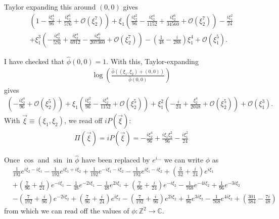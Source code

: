 \documentclass{article}
\theoremstyle{definition}
\newcommand{\nn}{\nonumber}
\newcommand{\f}[2]{\frac{#1}{#2}}
\newcommand{\lp}{\left(}
\newcommand{\rp}{\right)}
\begin{document}
Taylor expanding this around $(0,0)$ gives 
\begin{align}
\left(1-\frac{i\xi_2^4}{96}+\frac{i\xi_2^6}{576}+ \mathcal{O}\left( \xi_2^7\right)\right) + \xi_1 \left(\frac{i  \xi_2^2}{96}-\frac{i  \xi_2^4}{1152}+\frac{i  \xi_2^6}{34560}+ \mathcal{O}\left( \xi_2^7 \right)\right)-\frac{i\xi_1^2}{24}\nn\\
+ \xi_1^3 \left(-\frac{i\xi_2^2}{576}+\frac{i\xi_2^4}{6912}-\frac{i\xi_2^6}{207360}+ \mathcal{O}\left( \xi_2^7\right)\right)-\left(\frac{1}{48}-\frac{i}{288}\right)  \xi_1^4+ \mathcal{O}\left( \xi_1^5\right).
\end{align}

I have checked that $\hat{\phi}(0,0) = 1$. With this, Taylor-expanding
\begin{align}
\log\lp \f{\hat\phi((\xi_1,\xi_2) + (0,0))}{\hat\phi(0,0)} \rp
\end{align} 
gives
\begin{align}
\left(-\frac{i  \xi_2^4}{96}+\mathcal{O}\left( \xi_2^5\right)\right)+ \xi_1 \left(\frac{i  \xi_2^2}{96}-\frac{i  \xi_2^4}{1152}+\mathcal{O}\left( \xi_2^5\right)\right)+ \xi_1^2 \left(-\frac{i}{24}+\frac{ \xi_2^4}{2048}+\mathcal{O}\left( \xi_2^5\right)\right)+\mathcal{O}\left( \xi_1^3\right).
\end{align}
With $\vec\xi \equiv (\xi_1,\xi_2)$, we read off $iP(\vec\xi)$:
\begin{align}
\boxed{\Pi(\vec{\xi}) = iP(\vec{\xi}) = -\frac{i  \xi_2^4}{96} + \frac{i \xi_1  \xi_2^2}{96} -\f{i\xi_1^2}{24} }
\end{align}

Once $\cos$ and $\sin$ in $\hat{\phi}$ have been replaced by $e^{i\dots}$ we can write $\hat\phi$ as
\begin{align}
&\frac{1}{192} e^{i \xi_2-i \xi_1} -\frac{1}{192} e^{i \xi_1+i \xi_2} +\frac{1}{192} e^{-i \xi_1-i \xi_2} -\frac{1}{192} e^{i \xi_1-i\xi_2}+\left(\frac{3}{32}+\frac{i}{24}\right) e^{i \xi_1}\nn\\
&+\left(\frac{7}{96}+\frac{i}{24}\right) e^{-i \xi_1}-\frac{1}{48} e^{-2 i \xi_1}-\frac{1}{48} e^{2 i \xi_1}+\left(\frac{7}{96}+\frac{i}{24}\right) e^{-i \xi_2}-\frac{1}{768} e^{-4 i \xi_2}+\frac{1}{96} e^{-3 i \xi_2}\nn\\
&-\left(\frac{7}{192}+\frac{i}{96}\right) e^{-2 i \xi_2}+\left(\frac{7}{96}+\frac{i}{24}\right) e^{i \xi_2}-\left(\frac{7}{192}+\frac{i}{96}\right) e^{2 i \xi_2}+\frac{1}{96} e^{3 i \xi_2}-\frac{1}{768} e^{4 i \xi_2}+\left(\frac{301}{384}-\frac{7 i}{48}\right)
\end{align}
from which we can read off the values of $\phi: \mathbb{Z}^2 \to \mathbb{C}$. 
\end{document}
